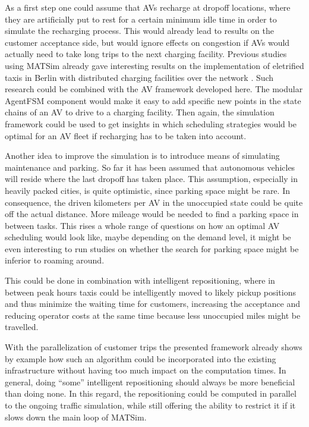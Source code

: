 As a first step one could assume that AVs recharge at dropoff locations, where they
are artificially put to rest for a certain minimum idle time in order to simulate
the recharging process. This would already lead to results on the customer acceptance
side, but would ignore effects on congestion if AVs would actually need to take long
trips to the next charging facility. Previous studies using MATSim already gave interesting results on the implementation
of eletrified taxis in Berlin with distributed charging facilities
over the network \citep{Bischoff2014}. Such research could be combined with the AV framework developed here.
The modular AgentFSM component would make it easy to add specific new points in the
state chains of an AV to drive to a charging facility. Then again, the simulation framework could be used to get insights in which scheduling
strategies would be optimal for an AV fleet if recharging has to be taken into account.

Another idea to improve the simulation is to introduce means of simulating maintenance
and parking. So far it has been assumed that autonomous vehicles will reside where the last
dropoff has taken place. This assumption, especially in heavily packed cities, is
quite optimistic, since parking space might be rare. In consequence, the driven
kilometers per AV in the unoccupied state could be quite off the actual distance.
More mileage would be needed to find a parking space in between tasks.
This rises a whole range of questions on how an optimal AV scheduling would
look like, maybe depending on the demand level, it might be even interesting to
run  studies on whether the search for parking space might be inferior
to roaming around.

This could be done in combination with intelligent repositioning, where in between peak
hours taxis could be intelligently moved to likely pickup positions and thus minimize the waiting
time for customers, increasing the acceptance and reducing
operator costs at the same time because less unoccupied miles might be travelled.

With the parallelization of customer trips the presented framework already shows
by example how such an algorithm could be incorporated into the existing infrastructure
without having too much impact on the computation times. In general, doing ``some''
intelligent repositioning should always be more beneficial than doing none. In
this regard, the repositioning could be computed in parallel to the ongoing
traffic simulation, while still offering the ability to restrict it if it slows
down the main loop of MATSim.

